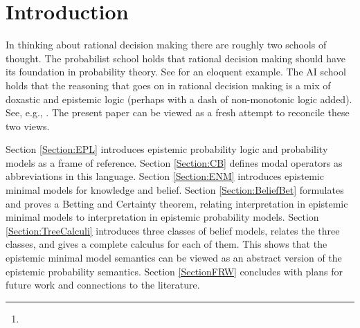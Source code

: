 \documentclass[12pt]{article}
\title{\ourtitle{}}
\author{\jan{}\\{}{\small\janAffiliation{}} \and
  \bryan{}\footnote{\bryanFunding{}}\\{}{\small\bryanAffiliation{}}}
\theoremstyle{definition}
\begin{document}
\maketitle

\begin{abstract}
  We investigate the logic of the operator ``I am willing to bet on
  $\phi$'' by relating a semantics for this in terms of probability
  models to a more abstract semantics in terms of epistemic
  neighborhood models.  This relates the perspective on rational
  decision making of the probabilist with that of the logician, and
  can perhaps be viewed as a step toward reconciliation.  We show
  completeness of various calculi, with respect to a class of
  epistemic neighborhood models with respect to a strictly smaller
  class of committed epistemic neighborhood models, and with respect a
  class of probability models that is in turn properly contained in
  this class. This demonstrates at the same time the power and the
  weakness of the logical point of view: logic is able to talk about
  larger classes of models, but at the price of being able to say
  less.
\end{abstract}

\section{Introduction}

In thinking about rational decision making there are roughly two
schools of thought. The probabilist school holds that rational
decision making should have its foundation in probability theory. See
\cite{koerner2008naive} for an eloquent example. The AI school holds
that the reasoning that goes on in rational decision making is a mix
of doxastic and epistemic logic (perhaps with a dash of non-monotonic
logic added). See, e.g., \cite{KyburgTeng2012:tlorkr}.  The present
paper can be viewed as a fresh attempt to reconcile these two views.

Section \ref{Section:EPL} introduces epistemic probability logic and
probability models as a frame of reference. Section \ref{Section:CB}
defines modal operators as abbreviations in this language.  Section
\ref{Section:ENM} introduces epistemic minimal models for knowledge
and belief. Section \ref{Section:BeliefBet} formulates and proves a
Betting and Certainty theorem, relating interpretation in epistemic
minimal models to interpretation in epistemic probability models.
Section \ref{Section:TreeCalculi} introduces three classes of belief
models, relates the three classes, and gives a complete calculus for
each of them.  This shows that the epistemic minimal model semantics
can be viewed as an abstract version of the epistemic probability
semantics.  Section \ref{SectionFRW} concludes with plans for future
work and connections to the literature.
\end{document}
